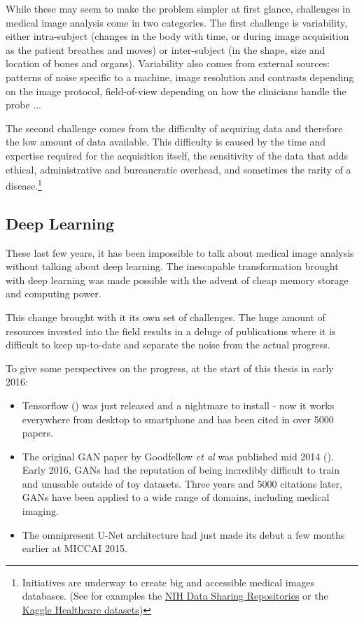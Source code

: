 While these may seem to make the problem simpler at first glance, challenges in medical image analysis come in two categories. The first challenge is variability, either intra-subject (changes in the body with time, or during image acquisition as the patient breathes and moves) or inter-subject (in the shape, size and location of bones and organs). Variability also comes from external sources: patterns of noise specific to a machine, image resolution and contrasts depending on the image protocol, field-of-view depending on how the clinicians handle the probe ... 

The second challenge comes from the difficulty of acquiring data and therefore the low amount of data available. This difficulty is caused by the time and expertise required for the acquisition itself, the sensitivity of the data that adds ethical, administrative and bureaucratic overhead, and sometimes the rarity of a disease.\footnote{Initiatives are underway to create big and accessible medical images databases. (See for examples the \href{https://www.nlm.nih.gov/NIHbmic/nih_data_sharing_repositories.html}{NIH Data Sharing Repositories} or the \href{https://www.kaggle.com/datasets?tagids=4202}{Kaggle Healthcare datasets})}

\subsection{Deep Learning}

These last few years, it has been impossible to talk about medical image analysis without talking about deep learning. The inescapable transformation brought with deep learning was made possible with the advent of cheap memory storage and computing power. %

This change brought with it its own set of challenges. The huge amount of resources invested into the field results in a deluge of publications where it is difficult to keep up-to-date and separate the noise from the actual progress.

To give some perspectives on the progress, at the start of this thesis in early 2016: 
\begin{itemize}
    \item Tensorflow (\textcite{tensorflow2015}) was just released and a nightmare to install - now it works everywhere from desktop to smartphone and has been cited in over 5000 papers.
    \item The original GAN paper by Goodfellow \textit{et al} was published mid 2014 (\textcite{goodfellow2014}). Early 2016, GANs had the reputation of being incredibly difficult to train and unusable outside of toy datasets. Three years and 5000 citations later, GANs have been applied to a wide range of domains, including medical imaging.
    \item The omnipresent U-Net architecture had just made its debut a few months earlier at MICCAI 2015.
\end{itemize}

